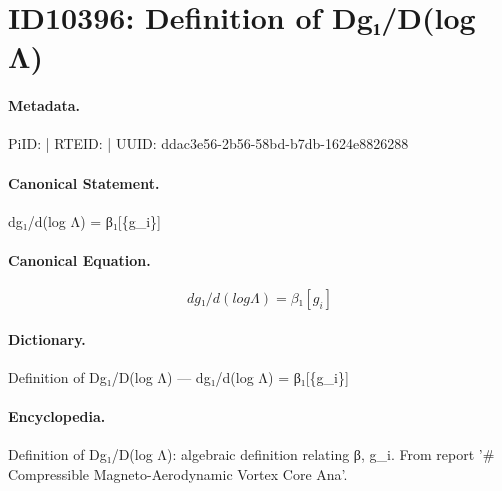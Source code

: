 \section*{ID10396: Definition of Dg₁/D(log Λ)}
\paragraph{Metadata.}
PiID:  | RTEID:  | UUID: ddac3e56-2b56-58bd-b7db-1624e8826288

\paragraph{Canonical Statement.}
dg₁/d(log Λ) = β₁[\{g\_i\}]

\paragraph{Canonical Equation.}
\[
dg₁/d(log Λ) = β₁[{g_i}]
\]

\paragraph{Dictionary.}
Definition of Dg₁/D(log Λ) — dg₁/d(log Λ) = β₁[\{g\_i\}]

\paragraph{Encyclopedia.}
Definition of Dg₁/D(log Λ): algebraic definition relating β, g\_i. From report '\# Compressible Magneto-Aerodynamic Vortex Core Ana'.
